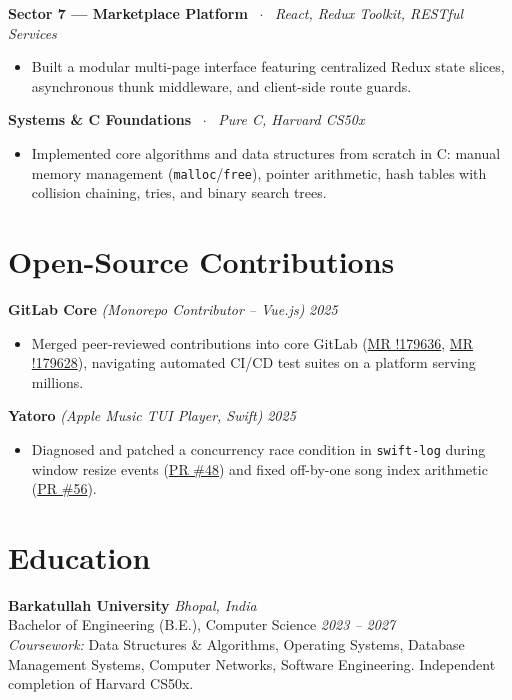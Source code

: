 \documentclass[10pt,a4paper]{article}
\begin{document}
\textbf{Sector 7 — Marketplace Platform} \ $\cdot$ \ \textit{React, Redux Toolkit, RESTful Services}
\begin{itemize}
    \item Built a modular multi-page interface featuring centralized Redux state slices, asynchronous thunk middleware, and client-side route guards.
\end{itemize}

\textbf{Systems \& C Foundations} \ $\cdot$ \ \textit{Pure C, Harvard CS50x}
\begin{itemize}
    \item Implemented core algorithms and data structures from scratch in C: manual memory management (\texttt{malloc}/\texttt{free}), pointer arithmetic, hash tables with collision chaining, tries, and binary search trees.
\end{itemize}

\section{Open-Source Contributions}
\textbf{GitLab Core} \textit{(Monorepo Contributor -- Vue.js)} \hfill \textit{2025}
\begin{itemize}
    \item Merged peer-reviewed contributions into core GitLab (\href{https://gitlab.com/gitlab-org/gitlab/-/merge_requests/179636}{MR !179636}, \href{https://gitlab.com/gitlab-org/gitlab/-/merge_requests/179628}{MR !179628}), navigating automated CI/CD test suites on a platform serving millions.
\end{itemize}

\textbf{Yatoro} \textit{(Apple Music TUI Player, Swift)} \hfill \textit{2025}
\begin{itemize}
    \item Diagnosed and patched a concurrency race condition in \texttt{swift-log} during window resize events (\href{https://github.com/jayadamsmorgan/Yatoro/pull/48}{PR \#48}) and fixed off-by-one song index arithmetic (\href{https://github.com/jayadamsmorgan/Yatoro/pull/56}{PR \#56}).
\end{itemize}

\section{Education}
\textbf{Barkatullah University} \hfill \textit{Bhopal, India} \\
Bachelor of Engineering (B.E.), Computer Science \hfill \textit{2023 -- 2027} \\
\textit{Coursework:} Data Structures \& Algorithms, Operating Systems, Database Management Systems, Computer Networks, Software Engineering. Independent completion of Harvard CS50x.
\end{document}
